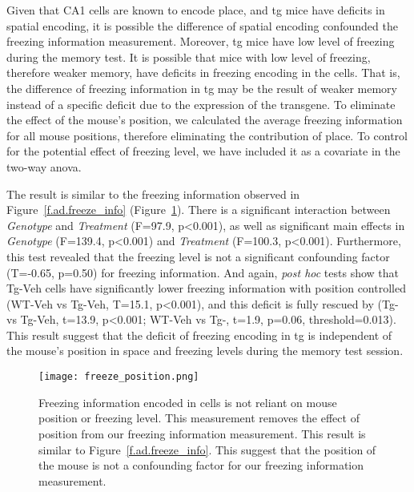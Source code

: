 Given that CA1 cells are known to encode place, and \gls{tg} mice have deficits in spatial encoding, it is possible the difference of spatial encoding confounded the freezing information measurement. Moreover, \gls{tg} mice have low level of freezing during the memory test. It is possible that mice with low level of freezing, therefore weaker memory, have deficits in freezing encoding in the cells. That is, the difference of freezing information in \gls{tg} may be the result of weaker memory instead of a specific deficit due to the expression of the transgene. To eliminate the effect of the mouse's position, we calculated the average freezing information for all mouse positions, therefore eliminating the contribution of place. To control for the potential effect of freezing level, we have included it as a covariate in the two-way \gls{anova}. 

The result is similar to the freezing information observed in Figure~\ref{f.ad.freeze_info} (Figure~\ref{f.ad.freeze_ctrl}). There is a significant interaction between \textit{Genotype} and \textit{Treatment} (F=97.9, p<0.001), as well as significant main effects in \textit{Genotype} (F=139.4, p<0.001) and \textit{Treatment} (F=100.3, p<0.001). Furthermore, this test revealed that the freezing level is not a significant confounding factor (T=-0.65, p=0.50) for freezing information. And again, \textit{post hoc} tests show that Tg-Veh cells have significantly lower freezing information with position controlled (WT-Veh vs Tg-Veh, T=15.1, p<0.001), and this deficit is fully rescued by \tglu{} (Tg-\glu{} vs Tg-Veh, t=13.9, p<0.001; WT-Veh vs Tg-\glu, t=1.9, p=0.06, threshold=0.013). This result suggest that the deficit of freezing encoding in \gls{tg} is independent of the mouse's position in space and freezing levels during the memory test session.
\begin{figure}[h]
    \texttt{[image: freeze\_position.png]}
    \caption[Position-controlled freezing information.]{Freezing information encoded in cells is not reliant on mouse position or freezing level. This measurement removes the effect of position from our freezing information measurement. This result is similar to Figure~\ref{f.ad.freeze_info}. This suggest that the position of the mouse is not a confounding factor for our freezing information measurement. \label{f.ad.freeze_ctrl}}
\end{figure}

